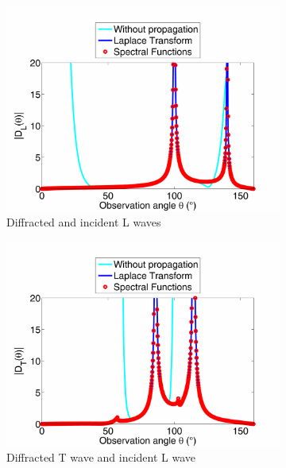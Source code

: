 \begin{figure}
\centering
    \begin{subfigure}[b]{0.44\textwidth}
        \includegraphics[width=\textwidth]{images/chapter3/Figure9a.pdf}
        \caption{Diffracted and incident L waves}
    \end{subfigure}  
    \begin{subfigure}[b]{0.44\textwidth}
        \includegraphics[width=\textwidth]{images/chapter3/Figure9b.pdf}
        \caption{Diffracted T wave and incident L wave}
     \end{subfigure} \\   
     \begin{subfigure}[b]{0.44\textwidth}

\end{subfigure}
\end{figure}

